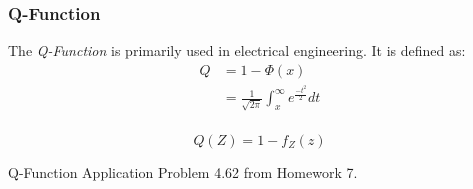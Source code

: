 		\subsubsection{Q-Function} \label{subsubsec:Q-Function}
			\begin{definition}[Q-Function] \label{def:Q-Function}
				The \emph{Q-Function} is primarily used in electrical engineering.
				It is defined as:
				\begin{equation} \label{eq:Q-Function}
					\begin{aligned}
						Q &= 1 - \Phi \left( x \right) \\
						&= \frac{1}{\sqrt{2 \pi}} \int_{x}^{\infty} e^{\frac{-t^{2}}{2}} dt \\
					\end{aligned}
				\end{equation}
				\begin{remark}
					\begin{equation}
						Q \left( Z \right) = 1-f_{Z} \left( z \right)
					\end{equation}
				\end{remark}
			\end{definition}
			\begin{example}[Problem 4.62]{Q-Function Application}
				Problem 4.62 from Homework 7.
			\end{example}
	
